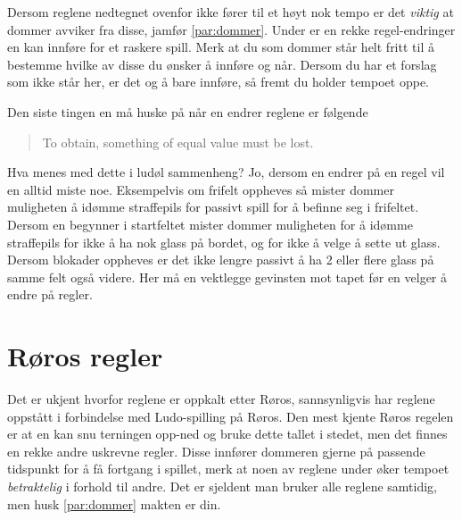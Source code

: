 \documentclass[10pt,a4paper,norsk,openany]{book}
\begin{document}
Dersom reglene nedtegnet ovenfor ikke fører til et høyt nok tempo er det
\emph{viktig} at dommer avviker fra disse, jamfør \cref{par:dommer}. Under er en
rekke regel-endringer en kan innføre for et raskere spill. Merk at du som dommer
står helt fritt til å bestemme hvilke av disse du ønsker å innføre og når.
Dersom du har et forslag som ikke står her, er det og å bare innføre, så fremt
du holder tempoet oppe.

Den siste tingen en må huske på når en endrer reglene er følgende
%
\begin{quote}
  \centering
  To obtain, something of equal value must be lost.
\end{quote}
%
Hva menes med dette i ludøl sammenheng? Jo, dersom en endrer på en regel vil en
alltid miste noe. Eksempelvis om frifelt oppheves så mister dommer muligheten å
idømme straffepils for passivt spill for å befinne seg i frifeltet. Dersom en
begynner i startfeltet mister dommer muligheten for å idømme straffepils for
ikke å ha nok glass på bordet, og for ikke å velge å sette ut glass. Dersom
blokader oppheves er det ikke lengre passivt å ha 2 eller flere glass på samme
felt også videre. Her må en vektlegge gevinsten mot tapet før en velger å endre
på regler.


\section{Røros regler}

Det er ukjent hvorfor reglene er oppkalt etter Røros, sannsynligvis har reglene
oppstått i forbindelse med Ludo-spilling på Røros. Den mest kjente Røros regelen
er at en kan snu terningen opp-ned og bruke dette tallet i stedet, men det
finnes en rekke andre uskrevne regler. Disse innfører dommeren gjerne på
passende tidspunkt for å få fortgang i spillet, merk at noen av reglene under
øker tempoet \emph{betraktelig} i forhold til andre. Det er sjeldent man bruker
alle reglene samtidig, men husk \cref{par:dommer} makten er din.
\end{document}

